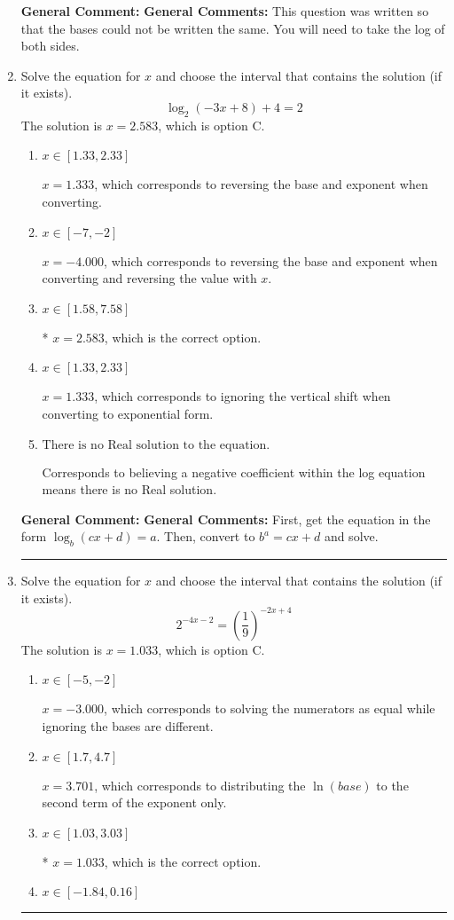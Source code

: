 \documentclass{extbook}[14pt]
\newcommand{\litem}[1]{\item #1

\rule{\textwidth}{0.4pt}}
\begin{document}
\begin{enumerate}
{\textbf{General Comment:} \textbf{General Comments:} This question was written so that the bases could not be written the same. You will need to take the log of both sides.
}
\litem{
Solve the equation for $x$ and choose the interval that contains the solution (if it exists).
\[ \log_{2}{(-3x+8)}+4 = 2 \]The solution is \( x = 2.583 \), which is option C.\begin{enumerate}[label=\Alph*.]
\item \( x \in [1.33, 2.33] \)

$x = 1.333$, which corresponds to reversing the base and exponent when converting.
\item \( x \in [-7, -2] \)

$x = -4.000$, which corresponds to reversing the base and exponent when converting and reversing the value with $x$.
\item \( x \in [1.58, 7.58] \)

* $x = 2.583$, which is the correct option.
\item \( x \in [1.33, 2.33] \)

$x = 1.333$, which corresponds to ignoring the vertical shift when converting to exponential form.
\item \( \text{There is no Real solution to the equation.} \)

Corresponds to believing a negative coefficient within the log equation means there is no Real solution.
\end{enumerate}

\textbf{General Comment:} \textbf{General Comments:} First, get the equation in the form $\log_b{(cx+d)} = a$. Then, convert to $b^a = cx+d$ and solve.
}
\litem{
Solve the equation for $x$ and choose the interval that contains the solution (if it exists).
\[ 2^{-4x-2} = \left(\frac{1}{9}\right)^{-2x+4} \]The solution is \( x = 1.033 \), which is option C.\begin{enumerate}[label=\Alph*.]
\item \( x \in [-5, -2] \)

$x = -3.000$, which corresponds to solving the numerators as equal while ignoring the bases are different.
\item \( x \in [1.7, 4.7] \)

$x = 3.701$, which corresponds to distributing the $\ln(base)$ to the second term of the exponent only.
\item \( x \in [1.03, 3.03] \)

* $x = 1.033$, which is the correct option.
\item \( x \in [-1.84, 0.16] \)


\end{enumerate}}
\end{enumerate}
\end{document}
